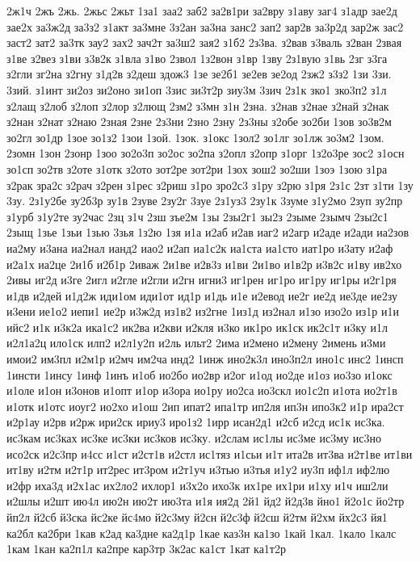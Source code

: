 {2ж1ч
2жъ
2жь.
2жьс
2жьт
1за1
заа2
заб2
за2в1ри
за2вру
з1аву
заг4
з1адр
зае2д
зае2х
за3ж2д
за3з2
з1акт
за3мне
3з2ан
за3на
занс2
зап2
зар2в
за3р2д
зар2ж
зас2
заст2
зат2
за3тк
зау2
зах2
зач2т
за3ш2
зая2
з1б2
2з3ва.
з2вав
з3валь
з2ван
2звая
з1ве
з2вез
з1ви
з3в2к
з1вла
з1во
2звол
1з2вон
з1вр
1зву
2з1вую
з1вь
2зг
з3га
з2гли
зг2на
з2гну
з1д2в
з2деш
здож3
1зе
зе2б1
зе2ев
зе2од
2зж2
з3з2
1зи
3зи.
3зий.
з1инт
зи2оз
зи2оно
зи1оп
3зис
зи3т2р
зиу3м
3зич
2з1к
зко1
зко3п2
з1л
з2лащ
з2лоб
з2лоп
з2лор
з2лющ
2зм2
з3мн
з1н
2зна.
з2нав
з2нае
з2най
з2нак
з2нан
з2нат
з2наю
2зная
2зне
2з3ни
2зно
2зну
2з3ны
з2обе
зо2би
1зов
зо3в2м
зо2гл
зо1др
1зое
зо1з2
1зои
1зой.
1зок.
з1окс
1зол2
зо1лг
зо1лж
зо3м2
1зом.
2зомн
1зон
2зонр
1зоо
зо2о3п
зо2ос
зо2па
з2опл
з2опр
з1орг
1з2о3ре
зос2
з1осн
зо1сп
зо2тв
з2оте
з1отк
з2ото
зот2ре
зот2ри
1зох
зош2
зо2ши
1зоэ
1зою
з1ра
з2рак
зра2с
з2рач
з2рен
з1рес
з2риш
з1ро
зро2с3
з1ру
з2рю
з1ря
2з1с
2зт
з1ти
1зу
3зу.
2з1у2бе
зу2б3р
зу1в
2зуве
2зу2г
3зуе
2з1уз3
2зу1к
3зуме
з1у2мо
2зуп
зу2пр
з1урб
з1у2те
зу2час
2зц
з1ч
2зш
зъе2м
1зы
2зы2г1
зы2з
2зыме
2зымч
2зы2с1
2зыщ
1зье
1зьи
1зью
3зья
1з2ю
1зя
и1а
и2аб
и2ав
иаг2
и2агр
и2аде
и2ади
иа2зов
иа2му
и3ана
иа2нал
ианд2
иао2
и2ап
иа1с2к
иа1ста
иа1сто
иат1ро
и3ату
и2аф
и2а1х
иа2це
2и1б
и2б1р
2иваж
2и1ве
и2в3з
и1ви
2и1во
и1в2р
и3в2с
и1ву
ив2хо
2ивы
иг2д
и3ге
2игл
и2гле
и2гли
и2гн
игни3
иг1рен
иг1ро
иг1ру
иг1ры
и2г1ря
и1дв
и2дей
и1д2ж
иди1ом
иди1от
ид1р
и1дь
и1е
и2евод
ие2г
ие2д
ие3де
ие2зу
и3ени
ие1о2
иепи1
ие2р
и3ж2д
из1в2
из2гне
1из1д
из2нал
и1зо
изо2о
из1р
и1и
ийс2
и1к
и3к2а
ика1с2
ик2ва
и2кви
и2кля
и3ко
ик1ро
ик1ск
ик2с1т
и3ку
и1л
и2л1а2ц
ило1ск
илп2
и2л1у2п
и2ль
ильт2
2има
и2мено
и2мену
2имень
и3ми
имои2
им3пл
и2м1р
и2мч
им2ча
инд2
1инж
ино2к3л
ино3п2л
ино1с
инс2
1инсп
1инсти
1инсу
1инф
1инъ
и1об
ио2бо
ио2вр
и2ог
и1од
ио2де
и1оз
ио3зо
и1окс
и1оле
и1он
и3онов
и1опт
и1ор
и3ора
ио1ру
ио2са
ио3скл
ио1с2п
и1ота
ио2т1в
и1отк
и1отс
иоуг2
ио2хо
и1ош
2ип
ипат2
ипа1тр
ип2ля
ип3н
ипо3к2
и1р
ира2ст
и2р1ау
и2рв
и2рж
ири2ск
ириу3
иро1з2
1ирр
исан2д1
и2сб
и2сд
ис1к
ис3ка.
ис3кам
ис3ках
ис3ке
ис3ки
ис3ков
ис3ку.
и2слам
ис1лы
ис3ме
ис3му
ис3но
исо2ск
и2с3пр
и4сс
и1ст
и2ст1в
и2стл
ис1тяз
и1сьи
и1т
ита2в
ит3ва
и2т1ве
ит1ви
ит1ву
и2тм
и2т1р
ит2рес
ит3ром
и2т1уч
и3тью
и3тья
и1у2
иу3п
иф1л
иф2лю
и2фр
иха3д
и2х1ас
их2ло2
ихлор1
и3х2о
ихо3к
их1ре
их1ри
и1ху
и1ч
иш2ли
и2шлы
и2шт
ию4л
ию2н
ию2т
ию3та
и1я
ия2д
2й1
йд2
й2д3в
йно1
й2о1с
йо2тр
йп2л
й2сб
й3ска
йс2ке
йс4мо
й2с3му
й2сн
й2с3ф
й2сш
й2тм
й2хм
йх2с3
йя1
ка2бл
ка2бри
1кав
к2ад
ка3дне
ка2д1р
1кае
каз3н
ка1зо
1кай
1кал.
1кало
1калс
1кам
1кан
ка2п1л
ка2пре
кар3тр
3к2ас
ка1ст
1кат
ка1т2р
}

